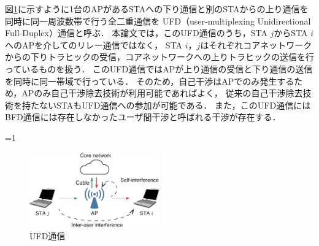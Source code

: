 \documentclass[master]{kuisthesis}		%
\newcounter{flagFig}
\begin{document}
			\par
			図\ref{fig:model_ufd}に示すように1台のAPがあるSTAへの下り通信と別のSTAからの上り通信を同時に同一周波数帯で行う全二重通信を
			UFD（user-multiplexing Unidirectional Full-Duplex）通信と呼ぶ．
			本論文では，このUFD通信のうち，STA $j$からSTA $i$へのAPを介してのリレー通信ではなく，
			STA $i$，$j$はそれぞれコアネットワークからの下りトラヒックの受信，コアネットワークへの上りトラヒックの送信を行っているものを扱う．
			このUFD通信ではAPが上り通信の受信と下り通信の送信を同時に同一帯域で行っている．
			そのため，自己干渉はAPでのみ発生するため，APのみ自己干渉除去技術が利用可能であればよく，
			従来の自己干渉除去技術を持たないSTAもUFD通信への参加が可能である．
			また，このUFD通信にはBFD通信には存在しなかったユーザ間干渉と呼ばれる干渉が存在する．

			\ifnum\value{flagFig}=1 {\begin{figure}[t]
				\begin{center}
					\includegraphics[width=0.5\textwidth]{fig/ufd.eps}
					\caption{UFD通信}
					\label{fig:model_ufd}
				\end{center}
			\end{figure}}\fi

\end{document}
